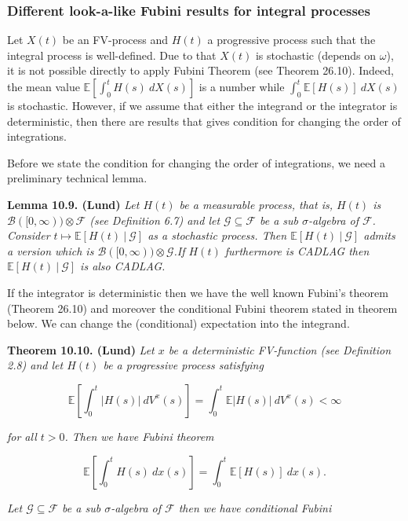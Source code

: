 \documentclass[a4paper,10pt,openany]{book}
\begin{document}
\hypertarget{different-look-a-like-fubini-results-for-integral-processes}{%
\subsubsection{Different look-a-like Fubini results for integral processes}\label{different-look-a-like-fubini-results-for-integral-processes}}

Let \(X(t)\) be an FV-process and \(H(t)\) a progressive process such that the integral process is well-defined. Due to that \(X(t)\) is stochastic (depends on \(\omega\)), it is not possible directly to apply Fubini Theorem (see Theorem 26.10). Indeed, the mean value \(\mathbb E[\int_0^t H(s)\ dX(s)]\) is a number while \(\int_0^t\mathbb E[H(s)]\ dX(s)\) is stochastic. However, if we assume that either the integrand or the integrator is deterministic, then there are results that gives condition for changing the order of integrations.

Before we state the condition for changing the order of integrations, we need a preliminary technical lemma.

\textbf{Lemma 10.9. (Lund)} \emph{Let \(H(t)\) be a measurable process, that is, \(H(t)\) is \(\mathcal B([0, \infty)) \otimes\mathcal F\) (see Definition 6.7) and let \(\mathcal G \subseteq\mathcal F\) be a sub \(\sigma\)-algebra of \(\mathcal F\). Consider \(t\mapsto \mathbb E[H(t)\ \vert\ \mathcal G]\) as a stochastic process. Then \(\mathbb E[H(t)\ \vert\ \mathcal G]\) admits a version which is \(\mathcal B([0, \infty)) \otimes\mathcal G\).If \(H(t)\) furthermore is CADLAG then \(\mathbb E[H(t)\ \vert\ \mathcal G]\) is also CADLAG.}

If the integrator is deterministic then we have the well known Fubini's theorem (Theorem 26.10) and moreover the conditional Fubini theorem stated in theorem below. We can change the (conditional) expectation into the integrand.

\textbf{Theorem 10.10. (Lund)} \emph{Let \(x\) be a deterministic FV-function (see Definition 2.8) and let \(H(t)\) be a progressive process satisfying}

\[
\mathbb E\left[\int_0^t\vert H(s)\vert\ dV^x(s)\right]=\int_0^t \mathbb E\vert H(s)\vert\ dV^x(s) <\infty
\]

\emph{for all \(t>0\). Then we have Fubini theorem}

\[
\mathbb E\left[\int_0^t H(s)\ dx(s)\right]=\int_0^t \mathbb E[ H(s)]\ dx(s).
\]

\emph{Let \(\mathcal G \subseteq\mathcal F\) be a sub \(\sigma\)-algebra of \(\mathcal F\) then we have conditional Fubini}
\end{document}
